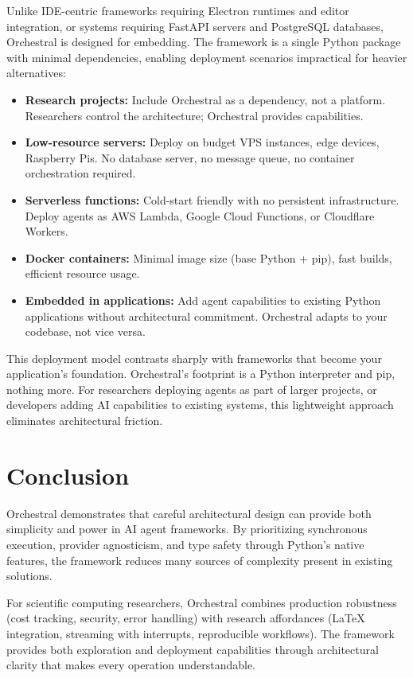 \documentclass{article}
\begin{document}
Unlike IDE-centric frameworks requiring Electron runtimes and editor integration, or systems requiring FastAPI servers and PostgreSQL databases, Orchestral is designed for embedding. The framework is a single Python package with minimal dependencies, enabling deployment scenarios impractical for heavier alternatives:

\begin{itemize}
    \item \textbf{Research projects:} Include Orchestral as a dependency, not a platform. Researchers control the architecture; Orchestral provides capabilities.
    \item \textbf{Low-resource servers:} Deploy on budget VPS instances, edge devices, Raspberry Pis. No database server, no message queue, no container orchestration required.
    \item \textbf{Serverless functions:} Cold-start friendly with no persistent infrastructure. Deploy agents as AWS Lambda, Google Cloud Functions, or Cloudflare Workers.
    \item \textbf{Docker containers:} Minimal image size (base Python + pip), fast builds, efficient resource usage.
    \item \textbf{Embedded in applications:} Add agent capabilities to existing Python applications without architectural commitment. Orchestral adapts to your codebase, not vice versa.
\end{itemize}

This deployment model contrasts sharply with frameworks that become your application's foundation. Orchestral's footprint is a Python interpreter and pip, nothing more. For researchers deploying agents as part of larger projects, or developers adding AI capabilities to existing systems, this lightweight approach eliminates architectural friction.

\section{Conclusion}

Orchestral demonstrates that careful architectural design can provide both simplicity and power in AI agent frameworks. By prioritizing synchronous execution, provider agnosticism, and type safety through Python's native features, the framework reduces many sources of complexity present in existing solutions.

For scientific computing researchers, Orchestral combines production robustness (cost tracking, security, error handling) with research affordances (LaTeX integration, streaming with interrupts, reproducible workflows). The framework provides both exploration and deployment capabilities through architectural clarity that makes every operation understandable.
\end{document}
